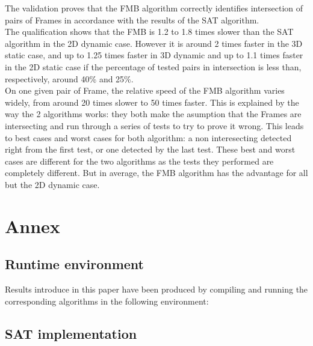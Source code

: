 \documentclass[12pt, a4paper]{article}
\begin{document}
The validation proves that the FMB algorithm correctly identifies intersection of pairs of Frames in accordance with the results of the SAT algorithm.\\

The qualification shows that the FMB is 1.2 to 1.8 times slower than the SAT algorithm in the 2D dynamic case. However it is around 2 times faster in the 3D static case, and up to 1.25 times faster in 3D dynamic and up to 1.1 times faster in the 2D static case if the percentage of tested pairs in intersection is less than, respectively, around 40\% and 25\%.\\

On one given pair of Frame, the relative speed of the FMB algorithm varies widely, from around 20 times slower to 50 times faster. This is explained by the way the 2 algorithms works: they both make the asumption that the Frames are intersecting and run through a series of tests to try to prove it wrong. This leads to best cases and worst cases for both algorithm: a non interesecting detected right from the first test, or one detected by the last test. These best and worst cases are different for the two algorithms as the tests they performed are completely different. But in average, the FMB algorithm has the advantage for all but the 2D dynamic case.\\

\section{Annex}

\subsection{Runtime environment}
\label{runtime_environment}

Results introduce in this paper have been produced by compiling and running the corresponding algorithms in the following environment:\\

\begin{scriptsize}
\begin{ttfamily}

\end{ttfamily}
\end{scriptsize}


\subsection{SAT implementation}
\label{sat_implementation}
\end{document}
